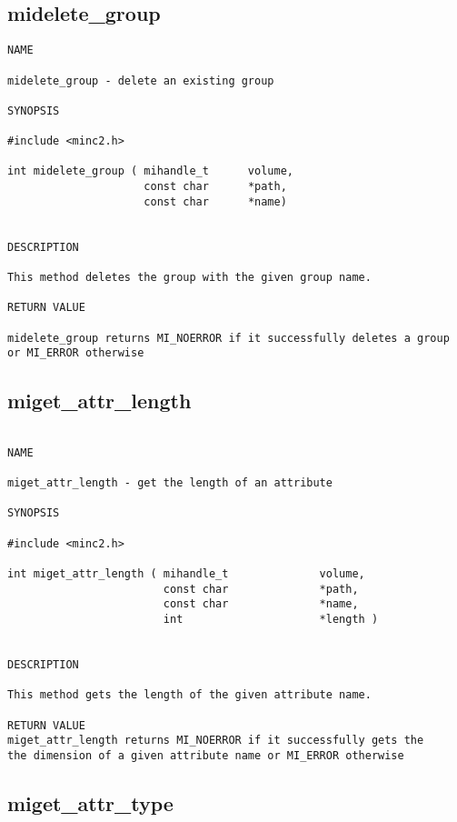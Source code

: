 \documentclass{article}
\begin{document}
\subsection{midelete\_group}

\begin{verbatim}
NAME 

midelete_group - delete an existing group

SYNOPSIS

#include <minc2.h>

int midelete_group ( mihandle_t      volume,
                     const char      *path,
                     const char      *name)    
                       
                                
DESCRIPTION

This method deletes the group with the given group name.

RETURN VALUE

midelete_group returns MI_NOERROR if it successfully deletes a group 
or MI_ERROR otherwise

\end{verbatim}

\subsection{miget\_attr\_length}

\begin{verbatim}

NAME 

miget_attr_length - get the length of an attribute

SYNOPSIS

#include <minc2.h>

int miget_attr_length ( mihandle_t              volume,
                        const char              *path,
                        const char              *name,
                        int                     *length ) 
               
                                
DESCRIPTION

This method gets the length of the given attribute name.

RETURN VALUE
miget_attr_length returns MI_NOERROR if it successfully gets the
the dimension of a given attribute name or MI_ERROR otherwise
\end{verbatim}

\subsection{miget\_attr\_type}
\end{document}
